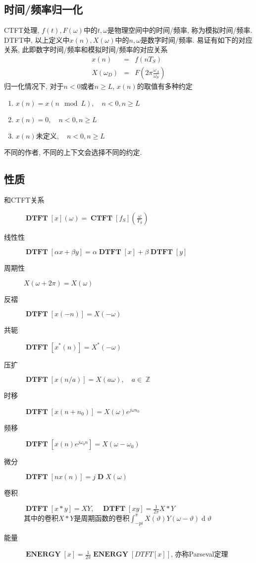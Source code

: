 \documentclass{ctexart}
\DeclareMathOperator{\CTFT}{\mathbf{CTFT}}
\DeclareMathOperator{\DTFT}{\mathbf{DTFT}}
\DeclareMathOperator{\ENERGY}{\mathbf{ENERGY}}
\DeclareMathOperator{\D}{\mathbf{D}}
\DeclareMathOperator{\ud}{\mathrm{d}}
\DeclareMathOperator{\Zset}{\mathbb{Z}}
\begin{document}
\subsection{时间/频率归一化}
    CTFT处理, $f(t), F(\omega)$中的$t, \omega$是物理空间中的时间/频率, 称为模拟时间/频率.
    DTFT中, 以上定义中$x(n), X(\omega)$中的$n, \omega$是数字时间/频率.
    易证有如下的对应关系, 此即数字时间/频率和模拟时间/频率的对应关系
    \begin{eqnarray*}
        x(n) &=& f(nT_S)\\
        X(\omega_D) &=& F(2\pi \frac{\omega_A}{\omega_S})
    \end{eqnarray*}
    归一化情况下, 对于$n < 0$或者$n \ge L$, $x(n)$的取值有多种约定 \begin{enumerate}
        \item $x(n) = x(n \mod L),\quad n < 0, n \ge L$
        \item $x(n) = 0,\quad n < 0, n \ge L$
        \item $x(n)$未定义$,\quad n < 0, n \ge L$
    \end{enumerate}
    不同的作者, 不同的上下文会选择不同的约定.

\subsection{性质}
    \begin{description}
        \item[和CTFT关系] $\displaystyle \DTFT[x](\omega) = \CTFT[f_S](\frac{\omega}{T_S})$
        \item[线性性] $\displaystyle \DTFT[\alpha x + \beta y] = \alpha \DTFT[x] + \beta \DTFT[y]$
        \item[周期性] $\displaystyle X(\omega + 2\pi) = X(\omega)$
        \item[反褶] $\displaystyle \DTFT[x(-n)] = X(-\omega)$
        \item[共轭] $\displaystyle \DTFT[x^*(n)] = X^*(-\omega)$
        \item[压扩] $\displaystyle \DTFT[x(n/a)] = X(a\omega), \quad a \in \Zset$
        \item[时移] $\displaystyle \DTFT[x(n + n_0)] = X(\omega) e^{j \omega n_0}$
        \item[频移] $\displaystyle \DTFT[x(n) e^{j \omega_0 n}] = X(\omega - \omega_0)$
        \item[微分] $\displaystyle \DTFT[nx(n)] = j \D X(\omega)$
        \item[卷积] $\displaystyle \DTFT[x * y] = X Y,\quad \DTFT[x y] = \frac{1}{2\pi} X * Y$\\
            其中的卷积$X * Y$是周期函数的卷积$\int_{-pi}^{\pi} X(\vartheta) Y(\omega - \vartheta) \ud \vartheta$
        \item[能量] $\displaystyle \ENERGY[x] = \frac{1}{2\pi} \ENERGY[DTFT[x]]$, 亦称Parseval定理
    \end{description}
\end{document}
